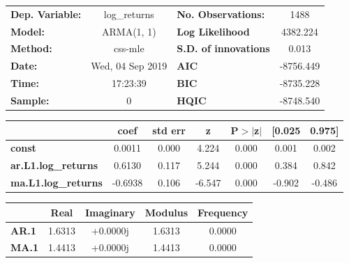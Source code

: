 \begin{center}
\begin{tabular}{lclc}
\toprule
\textbf{Dep. Variable:}     &        log\_returns       & \textbf{  No. Observations:  } &            1488            \\
\textbf{Model:}             &         ARMA(1, 1)        & \textbf{  Log Likelihood     } &          4382.224          \\
\textbf{Method:}            &          css-mle          & \textbf{  S.D. of innovations} &           0.013            \\
\textbf{Date:}              &      Wed, 04 Sep 2019     & \textbf{  AIC                } &         -8756.449          \\
\textbf{Time:}              &          17:23:39         & \textbf{  BIC                } &         -8735.228          \\
\textbf{Sample:}            &             0             & \textbf{  HQIC               } &         -8748.540          \\
\bottomrule
\end{tabular}
\begin{tabular}{lcccccc}
                            & \textbf{coef} & \textbf{std err} & \textbf{z} & \textbf{P$> |$z$|$} & \textbf{[0.025} & \textbf{0.975]}  \\
\midrule
\textbf{const}              &       0.0011  &        0.000     &     4.224  &         0.000        &        0.001    &        0.002     \\
\textbf{ar.L1.log\_returns} &       0.6130  &        0.117     &     5.244  &         0.000        &        0.384    &        0.842     \\
\textbf{ma.L1.log\_returns} &      -0.6938  &        0.106     &    -6.547  &         0.000        &       -0.902    &       -0.486     \\
\bottomrule
\end{tabular}
\begin{tabular}{lcccc}
              & \textbf{            Real} & \textbf{         Imaginary} & \textbf{         Modulus} & \textbf{        Frequency}  \\
\midrule
\textbf{AR.1} &                1.6313     &                +0.0000j     &                1.6313     &                0.0000       \\
\textbf{MA.1} &                1.4413     &                +0.0000j     &                1.4413     &                0.0000       \\
\bottomrule
\end{tabular}
\end{center}
